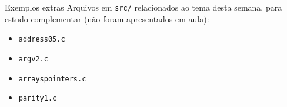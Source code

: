 \documentclass{beamer}
\begin{document}
\begin{frame}{Exemplos extras}
  Arquivos em \texttt{src/} relacionados ao tema desta semana, para
  estudo complementar (não foram apresentados em aula):
  \begin{itemize}
    \item \texttt{address05.c}
    \item \texttt{argv2.c}
    \item \texttt{arrayspointers.c}
    \item \texttt{parity1.c}
  \end{itemize}
\end{frame}
\end{document}
